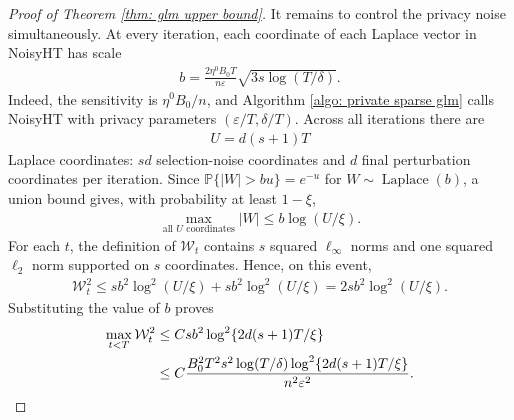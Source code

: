 \documentclass[letterpaper,12pt]{article}
\numberwithin{equation}{section}
\theoremstyle{plain}
\numberwithin{Theorem}{section}
\numberwithin{proposition}{section}
\numberwithin{Lemma}{section}
{
	\theoremstyle{definition}
	\newtheorem{Definition}{Definition}
	\newtheorem{example}{Example}
	\numberwithin{example}{section}
	\newtheorem{fact}{Fact}
	\numberwithin{fact}{section}
	\newtheorem{remark}{Remark}
}
\newcommand{\1}{\mathbbm{1}}
\def\Pr{\mathbb P}
\begin{document}
\begin{proof}[Proof of Theorem \ref{thm: glm upper bound}]
It remains to control the privacy noise simultaneously.  At every
iteration, each coordinate of each Laplace vector in NoisyHT has scale
\begin{align*}
    b
    =\frac{2\eta^0B_0T}{n\varepsilon}
    \sqrt{3s\log(T/\delta)}.
\end{align*}
Indeed, the sensitivity is $\eta^0B_0/n$, and Algorithm
\ref{algo: private sparse glm} calls NoisyHT with privacy parameters
$(\varepsilon/T,\delta/T)$.  Across all iterations there are
\begin{align*}
    U=d(s+1)T
\end{align*}
Laplace coordinates: $sd$ selection-noise coordinates and $d$ final
perturbation coordinates per iteration.  Since
$\Pr\{|W|>bu\}=e^{-u}$ for $W\sim\operatorname{Laplace}(b)$, a union
bound gives, with probability at least $1-\xi$,
\begin{align*}
    \max_{\text{all }U\text{ coordinates}}|W|
    \leq b\log(U/\xi).
\end{align*}
For each $t$, the definition of $\mathcal W_t$ contains $s$ squared
$\ell_\infty$ norms and one squared $\ell_2$ norm supported on $s$
coordinates.  Hence, on this event,
\begin{align*}
    \mathcal W_t^2
    \leq s b^2\log^2(U/\xi)+s b^2\log^2(U/\xi)
    =2s b^2\log^2(U/\xi).
\end{align*}
Substituting the value of $b$ proves
\begin{align}
    \max_{t<T}\mathcal W_t^2
    &\leq
    C s b^2
    \log^2\{2d(s+1)T/\xi\}\notag\\
    &\leq
    C\frac{B_0^2T^2s^2\log(T/\delta)
    \log^2\{2d(s+1)T/\xi\}}
    {n^2\varepsilon^2}.                                    \label{eq: repaired sparse noise concentration}
\end{align}


\end{proof}
\end{document}

